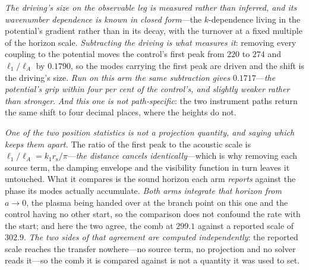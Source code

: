 \documentclass[11pt,a4paper]{article}
\theoremstyle{plain}
\theoremstyle{definition}
\theoremstyle{remark}
\newcommand{\rs}{r_{\mathrm{s}}}
\begin{document}
\emph{The driving's size on the observable leg is measured rather than inferred, and its wavenumber
dependence is known in closed form}---the $k$-dependence living in the potential's gradient rather than in its
decay, with the turnover at a fixed multiple of the horizon
scale.
\emph{Subtracting the driving is what measures it}: removing every coupling to the potential moves the
control's first peak from $220$ to $274$ and $\ell_{1}/\ell_{A}$ by $0.1790$, so the modes carrying the first
peak are driven and the shift is the driving's
size. \emph{Run on this arm the same
subtraction gives $0.1717$}---\emph{the potential's grip within four per cent of the control's, and slightly
weaker rather than stronger}.
\emph{And this one is not path-specific}: the two instrument paths return the same shift to four decimal
places, where the heights do not.

\emph{One of the two position statistics is not a projection quantity, and saying which keeps them apart.}
The ratio of the first peak to the acoustic scale is $\ell_{1}/\ell_{A}=k_{1}\rs/\pi$---\emph{the distance
cancels identically}---which is why removing each source term, the damping envelope and the visibility
function in turn leaves it untouched. What it compares is the sound horizon each arm \emph{reports} against
the phase its modes actually accumulate. \emph{Both arms integrate that horizon from $a\to0$}, the plasma
being handed over at the branch point on this one and the control having no other start, so the comparison
does not confound the rate with the
start; and here the two
agree, the comb at $299.1$ against a reported scale of $302.9$. \emph{The two sides of that agreement are
computed independently}: the reported scale reaches the transfer nowhere---no source term, no projection
and no solver reads it---so the comb it is compared against is not a quantity it was used to
set.
\end{document}
